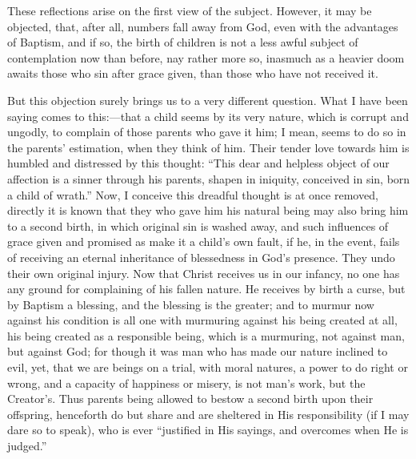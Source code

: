 These reflections arise on the first view of the subject. However,
it may be objected, that, after all, numbers fall away from God, even
with the advantages of Baptism, and if so, the birth of children is
not a less awful subject of contemplation now than before, nay rather
more so, inasmuch as a heavier doom awaits those who sin after grace
given, than those who have not received it.

But this objection surely brings us to a very different question.
What I have been saying comes to this:—that a child seems by its
very nature, which is corrupt and ungodly, to complain of those
parents who gave it him; I mean, seems to do so in the parents'
estimation, when they think of him. Their tender love towards him is
humbled and distressed by this thought: ``This dear and helpless
object of our affection is a sinner through his parents, shapen in
iniquity, conceived in sin, born a child of wrath.'' Now, I
conceive this dreadful thought is at once removed, directly it is
known that they who gave him his natural being may also bring him to a
second birth, in which original sin is washed away, and such
influences of grace given and promised as make it a child's own
fault, if he, in the event, fails of receiving an eternal inheritance
of blessedness in God's presence. They undo their own original
injury. Now that Christ receives us in our infancy, no one has any
ground for complaining of his fallen nature. He receives by birth a
curse, but by Baptism a blessing, and the blessing is the greater; and
to murmur now against his condition is all one with murmuring against
his being created at all, his being created as a responsible being,
which is a murmuring, not against man, but against God; for though it
was man who has made our nature inclined to evil, yet, that we are
beings on a trial, with moral natures, a power to do right or wrong,
and a capacity of happiness or misery, is not man's work, but the
Creator's. Thus parents being allowed to bestow a second birth upon
their offspring, henceforth do but share and are sheltered in His
responsibility (if I may dare so to speak), who is ever
``justified in His sayings, and overcomes when He is judged.''


